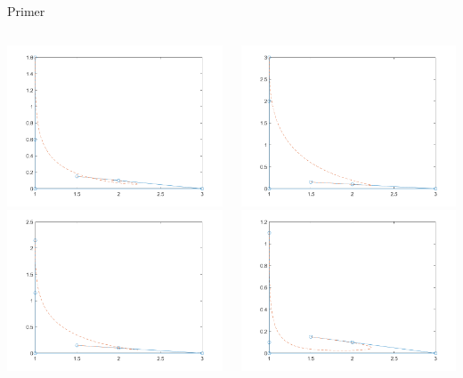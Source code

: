 \documentclass{beamer} %
\begin{document}
\begin{frame}{Primer}
	\begin{columns}[T]
		\begin{center}
		\includegraphics[width=0.6\columnwidth]{bloop.png}
		\includegraphics[width=0.6\columnwidth]{bcusp.png}
	\end{center}
		\begin{center}
		\includegraphics[width=0.6\columnwidth]{bprevoj.png}
		\includegraphics[width=0.6\columnwidth]{bno_sing.png}
		\end{center}
	\end{columns}
\end{frame}
\end{document}
